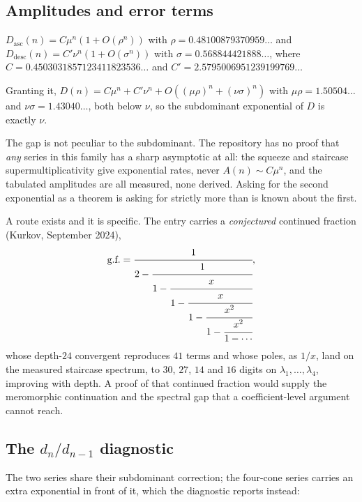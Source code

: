 \documentclass[11pt]{article}
\begin{document}
\subsection{Amplitudes and error terms}
\label{sec:notbuy}

\begin{conjecture}
\label{conj:sharp}
$D_{\mathrm{asc}}(n) = C\mu^n(1 + O(\rho^n))$ with $\rho = 0.48100879370959\dots$
and $D_{\mathrm{desc}}(n) = C'\nu^n(1 + O(\sigma^n))$ with
$\sigma = 0.568844421888\dots$, where $C = 0.4503031857123411823536\dots$ and
$C' = 2.5795006951239199769\dots$
\end{conjecture}

Granting it, $D(n) = C\mu^n + C'\nu^n + O((\mu\rho)^n + (\nu\sigma)^n)$ with
$\mu\rho = 1.50504\dots$ and $\nu\sigma = 1.43040\dots$, both below $\nu$, so the
subdominant exponential of $D$ is exactly $\nu$.

The gap is not peculiar to the subdominant. The repository has no proof that
\emph{any} series in this family has a sharp asymptotic at all:
the squeeze and staircase supermultiplicativity give exponential
rates, never $A(n) \sim C\mu^n$, and the tabulated amplitudes are all measured, none derived. Asking for the second
exponential as a theorem is asking for strictly more than is known about the
first.

A route exists and it is specific. The  entry carries a
\emph{conjectured} continued fraction (Kurkov, September 2024),
\[
  \text{g.f.} = \cfrac{1}{2 - \cfrac{1}{1 - \cfrac{x}{1 - \cfrac{x}{1 - \cfrac{x^2}{1 - \cfrac{x^2}{1 - \cdots}}}}}},
\]
whose depth-$24$ convergent reproduces $41$ terms and whose poles, as $1/x$,
land on the measured staircase spectrum, to $30$, $27$, $14$ and $16$ digits on
$\lambda_1,\dots,\lambda_4$, improving with depth. A proof of that continued
fraction would supply the meromorphic continuation and the spectral gap that a
coefficient-level argument cannot reach.

\subsection{The \texorpdfstring{$d_n/d_{n-1}$}{d\_n/d\_\{n-1\}} diagnostic}

The two series share their subdominant correction; the four-cone series carries
an extra exponential in front of it, which the diagnostic reports instead:
\end{document}

